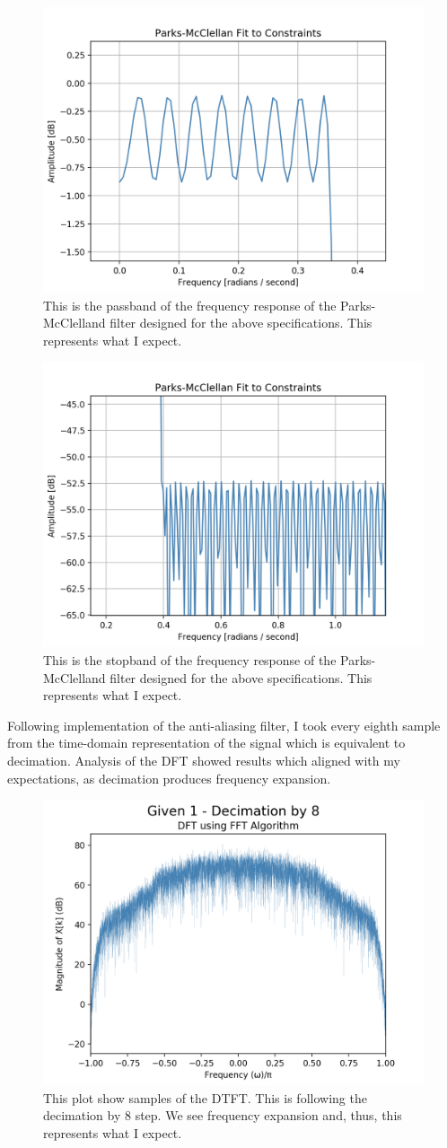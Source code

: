 \documentclass{article}
\begin{document}
\begin{figure}[h] \label{fig:parks_2}
    \centering
    \includegraphics[width=.5\textwidth]{given_1_parks_2.png}
    \caption{This is the passband of the frequency response of the Parks-McClelland filter designed for the above specifications. This represents what I expect.}
\end{figure}

\begin{figure}[h] \label{fig:parks_3}
    \centering
    \includegraphics[width=.5\textwidth]{given_1_parks_3.png}
    \caption{This is the stopband of the frequency response of the Parks-McClelland filter designed for the above specifications. This represents what I expect.}
\end{figure}

Following implementation of the anti-aliasing filter, I took every eighth sample from the time-domain representation of the signal which is equivalent to decimation. Analysis of the DFT showed results which aligned with my expectations, as decimation produces frequency expansion.

\begin{figure}[h] \label{fig:decimation_8}
    \centering
    \includegraphics[width=.5\textwidth]{given_1_decimation_by_8.png}
    \caption{This plot show samples of the DTFT. This is following the decimation by 8 step. We see frequency expansion and, thus, this represents what I expect.}
\end{figure}
\end{document}
